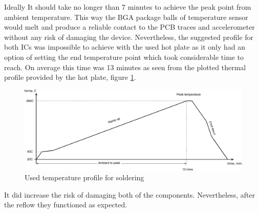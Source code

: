 Ideally It should take no longer than 7 minutes to achieve the peak point from ambient temperature. This way the BGA package balls of temperature sensor would melt and produce a reliable contact to the PCB traces and accelerometer  without any risk of damaging the device. Nevertheless, the suggested profile for both ICs was impossible to achieve with the used hot plate as it only had an option of setting the end temperature point which took considerable time to reach. On average this time was 13 minutes as seen from the plotted thermal profile provided by the hot plate, figure \ref{fig:temp_profile_used}.

\begin{figure}
\centering
\includegraphics[width=\textwidth]{Images/Thermal_profile_used}
\caption{Used temperature profile for soldering}
\label{fig:temp_profile_used}
\end{figure}

It did increase the risk of damaging both of the components. Nevertheless, after the reflow they functioned as expected.
